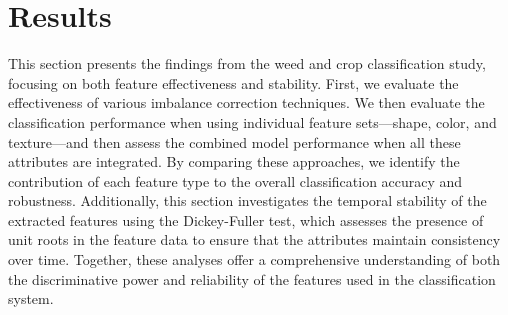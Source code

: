 \documentclass[letterpaper]{report}
\begin{document}
\chapter{Results}
\label{section:results}
This section presents the findings from the weed and crop classification study, focusing on both feature effectiveness and stability. First, we evaluate the effectiveness of various imbalance correction techniques.  We then evaluate the classification performance when using individual feature sets—shape, color, and texture—and then assess the combined model performance when all these attributes are integrated. By comparing these approaches, we identify the contribution of each feature type to the overall classification accuracy and robustness. Additionally, this section investigates the temporal stability of the extracted features using the Dickey-Fuller test, which assesses the presence of unit roots in the feature data to ensure that the attributes maintain consistency over time. Together, these analyses offer a comprehensive understanding of both the discriminative power and reliability of the features used in the classification system.
\end{document}
